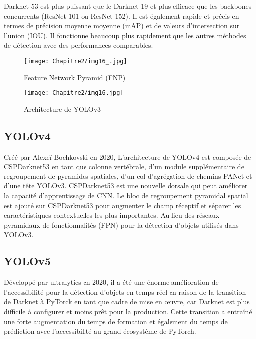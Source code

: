 Darknet-53  est plus puissant que le Darknet-19 et plus efficace que les backbones concurrents (ResNet-101 ou ResNet-152). Il est également rapide et précis en termes de précision moyenne moyenne (mAP) et de valeurs d'intersection sur l'union (IOU). Il fonctionne beaucoup plus rapidement que les autres méthodes de détection avec des performances comparables.

     \begin{figure}[H]
          \centering
          \texttt{[image: Chapitre2/img16\_.jpg]}
          \caption{Feature Network Pyramid (FNP)}
          \label{img16_}
          \end{figure}
     \begin{figure}[H]
          \centering
          \texttt{[image: Chapitre2/img16.jpg]}
          \caption{Architecture de YOLOv3}
          \label{img16}
          \end{figure}
     

\subsection{YOLOv4} 

Créé par Alexeï Bochkovski en 2020, L'architecture de YOLOv4 est composée de CSPDarknet53 en tant que colonne vertébrale, d'un module supplémentaire de regroupement de pyramides spatiales, d'un col d'agrégation de chemins PANet et d'une tête YOLOv3. CSPDarknet53 est une nouvelle dorsale qui peut améliorer la capacité d'apprentissage de CNN. Le bloc de regroupement pyramidal spatial est ajouté sur CSPDarknet53 pour augmenter le champ réceptif et séparer les caractéristiques contextuelles les plus importantes. Au lieu des réseaux pyramidaux de fonctionnalités (FPN) pour la détection d'objets utilisés dans YOLOv3.

\subsection{YOLOv5} 

Développé par ultralytics en 2020, il a été une énorme amélioration de l'accessibilité pour la détection d'objets en temps réel en raison de la transition de Darknet à PyTorck en tant que cadre de mise en œuvre, car Darknet est plus difficile à configurer et moins prêt pour la production. Cette transition a entraîné une forte augmentation du temps de formation et également du temps de prédiction avec l'accessibilité au grand écosystème de PyTorch.          
